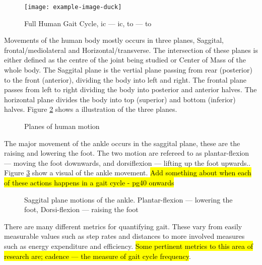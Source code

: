 \begin{figure}[hbt!]
    \centering
    \texttt{[image: example-image-duck]}
    \caption[Full Human Gait Cycle]{Full Human Gait Cycle, \acrshort{ic} --- \acrlong{ic}, \acrshort{to} --- \acrlong{to}}
    \label{fig:background_gait_cycle}
\end{figure}

Movements of the human body mostly occurs in three planes, Saggital, frontal/mediolateral and Horizontal/transverse. The intersection of these planes is either defined as the centre of the joint being studied or Center of Mass of the whole body. The Saggital plane is the vertial plane passing from rear (posterior) to the front (anterior), dividing the body into left and right. The frontal plane passes from left to right dividing the body into posterior and anterior halves. The horizontal plane divides the body into top (superior) and bottom (inferior) halves.\cite{Bartlett2007} Figure \ref{fig:background_planes_of_the_body} shows a illustration of the three planes.

\begin{figure}[!hbt]
    \centering
    \caption{Planes of human motion}
    \label{fig:background_planes_of_the_body}
\end{figure}

The major movement of the ankle occurs in the saggital plane, these are the raising and lowering the foot. The two motion are refereed to as plantar-flexion --- moving the foot downwards, and dorsiflexion --- lifting up the foot upwards.\cite{Bartlett2007}. Figure \ref{fig:background_plantar_dorsi_flexion} show a visual of the ankle movement. \hl{Add something about when each of these actions happens in a gait cycle{\cite{Whittle2012}} - pg40 onwards}

\begin{figure}[!hbt]
    \centering
    \caption{Saggital plane motions of the ankle. Plantar-flexion --- lowering the foot, Dorsi-flexion --- raising the foot}
    \label{fig:background_plantar_dorsi_flexion}
\end{figure}


There are many different metrics for quantifying gait. These vary from easily measurable values such as step rates and distances to more involved measures such as energy expenditure and efficiency. \hl{Some pertinent metrics to this area of research are; cadence --- the measure of gait cycle frequency}\cite{Ramakrishnan2019, Coutts1999}.



